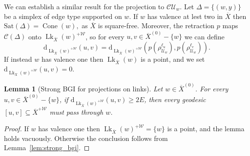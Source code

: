 \documentclass[svgnames]{amsart}
\theoremstyle{plain}
\newtheorem{lemma}[thm]{Lemma}
\theoremstyle{definition}
\newcommand{\C}{\mathcal C}
\newcommand{\ov}[1]{\overline{#1}}
\newcommand{\U}{\mathcal{U}}
\newcommand{\dist}{\mathrm{d}}
\newcommand{\link}{\operatorname{Lk}}
\newcommand{\Sat}{\mathrm{Sat}}
\newcommand{\W}{\mathcal{W}}
\newcommand{\Squid}{\operatorname{Cone}}
\begin{document}
We can establish a similar result for the projection to $\C\U_w$. Let $\Delta=\{(w,y)\}$ be a simplex of edge type supported on $w$. If $w$ has valence at lest two in $\ov X$ then $\Sat(\Delta)=\Squid(w),$ as $\ov X$ is square-free. Moreover, the retraction $p$ maps $\C(\Delta)$ onto $\link_{\ov X}(w)^{+\W}$, so for every $u,v\in \ov X^{(0)}-\{w\}$ we can define $$\dist_{\link_{\ov X}(w)^{+\W}}(u, v)=\dist_{\link_{\ov X}(w)^{+\W}}\left( p(\rho^{\ell_u}_{\U_w}), p(\rho^{\ell_v}_{\U_w})\right).$$
If instead $w$ has valence one then $\link_{\ov X}(w)$ is a point, and we set $\dist_{\link_{\ov X}(w)^{+\W}}(u, v)=0$.

\begin{lemma}[Strong BGI for projections on links]\label{lem:strong_bgi_for_short_edge_type}
    Let $w\in\ov X^{(0)}$. For every $u,v\in \ov X^{(0)}-\{w\}$, if $\dist_{\link_{\ov X}(w)^{+\W}}(u, v)\ge 2E$, then every geodesic $[u,v]\subseteq \ov X^{+\W}$ must pass through $w$.
\end{lemma}

\begin{proof}
     If $w$ has valence one then $\link_{\ov X}(w)^{+\W}=\{w\}$ is a point, and the lemma holds vacuously. Otherwise the conclusion follows from Lemma~\ref{lem:strong_bgi}. 
\end{proof}
\end{document}
